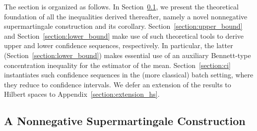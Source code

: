 The section is organized as follows. In Section~\ref{section:supermartingale_construction}, we present the theoretical foundation of all the inequalities derived thereafter, namely a novel nonnegative supermartingale construction and its corollary.  Section~\ref{section:upper_bound} and Section~\ref{section:lower_bound} make use of such theoretical tools to derive upper and lower confidence sequences, respectively. In particular, the latter (Section~\ref{section:lower_bound}) makes essential use of an auxiliary Bennett-type concentration inequality for the estimator of the mean. Section~\ref{section:ci} instantiates such confidence sequences in the (more classical) batch setting, where they reduce to confidence intervals. We defer an extension of the results to Hilbert spaces to Appendix~\ref{section:extension_hs}.  %

\subsection{A Nonnegative Supermartingale Construction} \label{section:supermartingale_construction}

